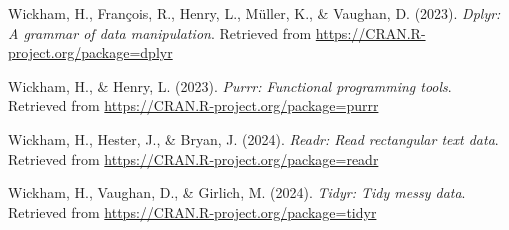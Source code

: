 \documentclass[
  man,floatsintext]{apa6}
\newlength{\cslhangindent}
\newenvironment{CSLReferences}[2] %
 {\begin{list}{}{%
  \setlength{\itemindent}{0pt}
  \setlength{\leftmargin}{0pt}
  \setlength{\parsep}{0pt}
  \ifodd #1
   \setlength{\leftmargin}{\cslhangindent}
   \setlength{\itemindent}{-1\cslhangindent}
  \fi
  \setlength{\itemsep}{#2\baselineskip}}}
 {\end{list}}
\begin{document}
\begin{CSLReferences}{1}{0}
Wickham, H., François, R., Henry, L., Müller, K., \& Vaughan, D. (2023). \emph{Dplyr: A grammar of data manipulation}. Retrieved from \url{https://CRAN.R-project.org/package=dplyr}

Wickham, H., \& Henry, L. (2023). \emph{Purrr: Functional programming tools}. Retrieved from \url{https://CRAN.R-project.org/package=purrr}

Wickham, H., Hester, J., \& Bryan, J. (2024). \emph{Readr: Read rectangular text data}. Retrieved from \url{https://CRAN.R-project.org/package=readr}

Wickham, H., Vaughan, D., \& Girlich, M. (2024). \emph{Tidyr: Tidy messy data}. Retrieved from \url{https://CRAN.R-project.org/package=tidyr}

\end{CSLReferences}
\end{document}
